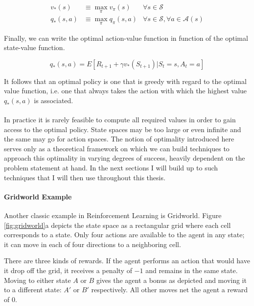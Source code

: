 \begin{align}
  v_*(s) &\equiv \max_{\pi} v_\pi(s) & \forall s \in \mathcal{S} \\
  q_*(s, a) &\equiv \max_\pi q_\pi(s,a) & \forall s \in \mathcal{S},
  \forall a \in \mathcal{A}(s)
  \label{eq:bellman}
\end{align}

Finally, we can write the optimal action-value function
in function of the optimal state-value function.

\begin{equation}
  q_*(s,a) = E[R_{t+1} + \gamma v_*(S_{t+1}) | S_t = s, A_t = a]
\end{equation}

It follows that an optimal policy is one that is greedy
with regard to the optimal value function,
i.e. one that always takes the action
with which the highest value $q_*(s,a)$ is associated.

\paragraph{}
In practice it is rarely feasible to compute all required values
in order to gain access to the optimal policy.
State spaces may be too large or even infinite
and the same may go for action spaces.
The notion of optimality introduced here serves only as a theoretical framework
on which we can build techniques to approach this optimality
in varying degrees of success,
heavily dependent on the problem statement at hand.
In the next sections I will build up to such techniques
that I will then use throughout this thesis.

\paragraph{Gridworld Example}
\label{par:gridworld}
Another classic example in Reinforcement Learning is Gridworld.
Figure \ref{fig:gridworld}a depicts the state space
as a rectangular grid where each cell corresponds to a state.
Only four actions are available to the agent in any state;
it can move in each of four directions to a neighboring cell.

There are three kinds of rewards.
If the agent performs an action that would have it drop off the grid,
it receives a penalty of $-1$ and remains in the same state.
Moving to either state $A$ or $B$ gives the agent a bonus as depicted
and moving it to a different state: $A'$ or $B'$ respectively.
All other moves net the agent a reward of $0$.

